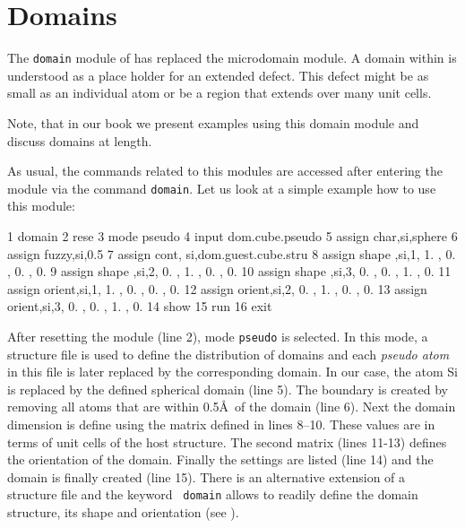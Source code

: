 
\section{Domains \label{mod-domain}}

The {\tt domain} module of \Discus has replaced the microdomain
module. A domain within \Discus is understood as a place holder
for an extended defect. This defect might be as small as an 
individual atom or be a region that extends over many unit cells.
 
Note, that in our book \citep{nedpro} we present examples using 
this domain module  and discuss domains at length. \par

As usual, the commands related to this modules are accessed after
entering the module via the command {\tt domain}. Let us look at a
simple example how to use this module:
%
\begin{MacVerbatim}
   1  domain
   2    rese
   3    mode   pseudo
   4    input  dom.cube.pseudo
   5    assign char,si,sphere
   6    assign fuzzy,si,0.5
   7    assign cont, si,dom.guest.cube.stru
   8    assign shape ,si,1,  1. , 0. , 0. ,  0.
   9    assign shape ,si,2,  0. , 1. , 0. ,  0.
  10    assign shape ,si,3,  0. , 0. , 1. ,  0.
  11    assign orient,si,1,  1. , 0. , 0. ,  0.
  12    assign orient,si,2,  0. , 1. , 0. ,  0.
  13    assign orient,si,3,  0. , 0. , 1. ,  0.
  14    show
  15    run
  16  exit
\end{MacVerbatim}
%
After resetting the module (line 2), mode {\tt pseudo} is selected.
In this mode, a \Discus structure file is used to define the
distribution of domains and each {\it pseudo atom} in this file is
later replaced by the corresponding domain. In our case, the atom Si
is replaced by the defined spherical domain (line 5). The boundary
is created by removing all atoms that are within 0.5\AA\ of the
domain (line 6). Next the domain dimension is define using the
matrix defined in lines 8--10. These values are in terms of unit
cells of the host structure. The second matrix (lines 11-13) defines
the orientation of the domain. Finally the settings are listed (line
14) and the domain is finally created (line 15). There is an
alternative extension of a structure file and the keyword {\tt
domain} allows to readily define the domain structure, its shape and
orientation (see \citet{nedpro}).
\par

